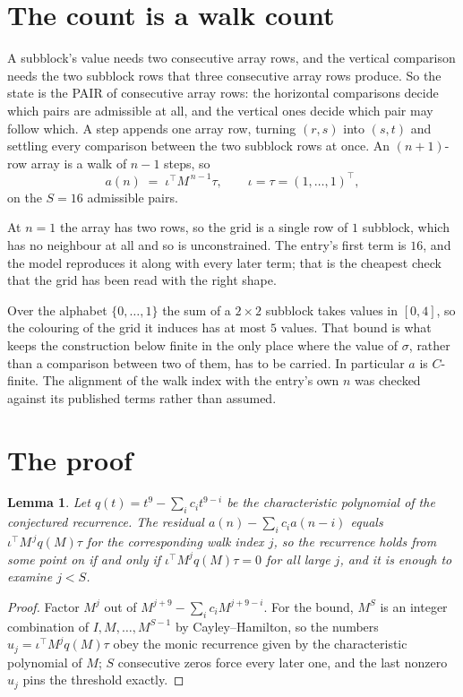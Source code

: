 \documentclass[11pt,a4paper]{article}
\theoremstyle{plain}
\newtheorem{lemma}[theorem]{Lemma}
\theoremstyle{definition}
\begin{document}
\section{The count is a walk count}

A subblock's value needs two consecutive array rows, and the vertical
comparison needs the two subblock rows that three consecutive array rows produce. So the state
is the PAIR of consecutive array rows: the horizontal comparisons decide which pairs are
admissible at all, and the vertical ones decide which pair may follow which. A step appends one
array row, turning $(r,s)$ into $(s,t)$ and settling every comparison between the two subblock
rows at once. An $(n+1)$-row array is a walk of $n-1$ steps, so
\[
a(n)\;=\;\iota^{\!\top}M^{\,n-1}\tau,\qquad\iota=\tau=(1,\dots,1)^{\!\top},
\]
on the $S=16$ admissible pairs.

At $n=1$ the array has two rows, so the grid is a single row of $1$
subblock, which has no neighbour at all and so is unconstrained. The
entry's first term is $16$, and the model reproduces it along with every later term; that
is the cheapest check that the grid has been read with the right shape.

Over the alphabet $\{0,\dots,1\}$ the sum of a $2\times2$ subblock takes values in
$[0,4]$, so the colouring of the grid it induces has at most $5$ values.
That bound is what keeps the construction below finite in the only place where the value of
$\sigma$, rather than a comparison between two of them, has to be carried.
In particular $a$ is $C$-finite. The alignment of the walk index with the entry's own $n$ was
checked against its published terms rather than assumed.

\section{The proof}

\begin{lemma}\label{lem:crit}
Let $q(t)=t^{9}-\sum_i c_it^{9-i}$ be the characteristic polynomial of the
conjectured recurrence. The residual $a(n)-\sum_ic_ia(n-i)$ equals
$\iota^{\!\top}M^{\,j}q(M)\tau$ for the corresponding walk index $j$, so the recurrence
holds from some point on if and only if $\iota^{\!\top}M^{j}q(M)\tau=0$ for all large $j$,
and it is enough to examine $j<S$.
\end{lemma}

\begin{proof}
Factor $M^{j}$ out of $M^{j+9}-\sum_ic_iM^{j+9-i}$. For the bound, $M^{S}$
is an integer combination of $I,M,\dots,M^{S-1}$ by Cayley--Hamilton, so the numbers
$u_j=\iota^{\!\top}M^{j}q(M)\tau$ obey the monic recurrence given by the characteristic
polynomial of $M$; $S$ consecutive zeros force every later one, and the last nonzero $u_j$
pins the threshold exactly.
\end{proof}
\end{document}
